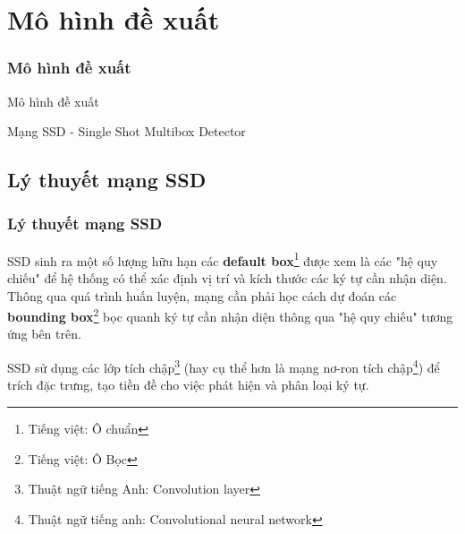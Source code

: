 \documentclass{beamer}
\begin{document}
\section{Mô hình đề xuất}
\begin{frame}
\frametitle{Mô hình đề xuất}
{\Huge Mô hình đề xuất}
\hspace{10 cm}




Mạng SSD - Single Shot Multibox Detector
\end{frame}

\subsection{Lý thuyết mạng SSD}

\frame{\tableofcontents[currentsection]}

\begin{frame}
\frametitle{Lý thuyết mạng SSD}

SSD\cite{liu2016ssd} sinh ra một số lượng hữu hạn các \textbf{default box}\footnote{Tiếng việt: Ô chuẩn} được xem là các "hệ quy chiếu" để hệ thống có thể xác định vị trí và kích thước các ký tự cần nhận diện. Thông qua quá trình huấn luyện, mạng cần phải học cách dự đoán các \textbf{bounding box}\footnote{Tiếng việt: Ô Bọc} bọc quanh ký tự cần nhận diện thông qua "hệ quy chiếu" tương ứng bên trên.

SSD\cite{liu2016ssd} sử dụng các lớp tích chập\footnote{Thuật ngữ tiếng Anh: Convolution layer} (hay cụ thể hơn là mạng nơ-ron tích chập\footnote{Thuật ngữ tiếng anh: Convolutional neural network}) để trích đặc trưng, tạo tiền đề cho việc phát hiện và phân loại ký tự. \\

\end{frame}


\end{document}

